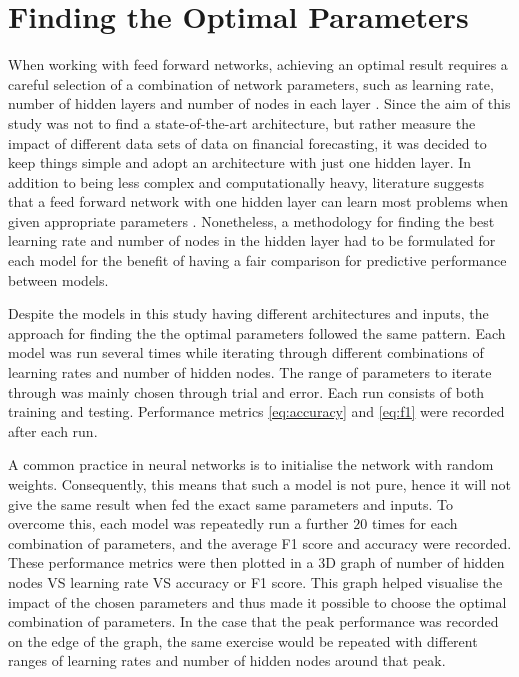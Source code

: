 \documentclass{UoYCSproject}
\begin{document}
\section{Finding the Optimal Parameters}
\label{sec:optimalparams}
When working with feed forward networks, achieving an optimal result requires a careful selection of a combination of network parameters, such as learning rate, number of hidden layers and number of nodes in each layer \cite{hussain2008financial}. Since the aim of this study was not to find a state-of-the-art architecture, but rather measure the impact of different data sets of data on financial forecasting, it was decided to keep things simple and adopt an architecture with just one hidden layer. In addition to being less complex and computationally heavy, literature suggests that a feed forward network with one hidden layer can learn most problems when given appropriate parameters \cite{cybenko1989approximation}. Nonetheless, a methodology for finding the best learning rate and number of nodes in the hidden layer had to be formulated for each model for the benefit of having a fair comparison for predictive performance between models.   

Despite the models in this study having different architectures and inputs, the approach for finding the the optimal parameters followed the same pattern. Each model was run several times while iterating through different combinations of learning rates and number of hidden nodes. The range of parameters to iterate through was mainly chosen through trial and error. Each run consists of both training and testing. Performance metrics \ref{eq:accuracy} and \ref{eq:f1} were recorded after each run.

A common practice in neural networks is to initialise the network with random weights. Consequently, this means that such a model is not pure, hence it will not give the same result when fed the exact same parameters and inputs. To overcome this, each model was repeatedly run a further $20$ times for each combination of parameters, and the average F1 score and accuracy were recorded. These performance metrics were then plotted in a 3D graph of number of hidden nodes VS learning rate VS accuracy or F1 score. This graph helped visualise the impact of the chosen parameters and thus made it possible to choose the optimal combination of parameters. In the case that the peak performance was recorded on the edge of the graph, the same exercise would be repeated with different ranges of learning rates and number of hidden nodes around that peak.
\end{document}
